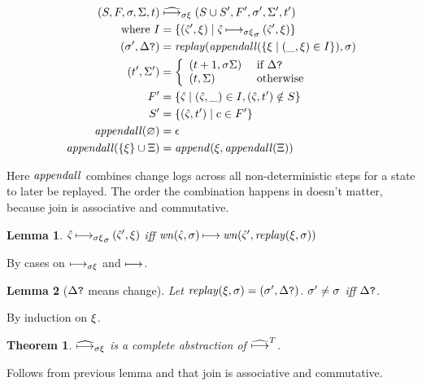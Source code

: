 \documentclass[preprint,onecolumn,9pt]{sigplanconf} %
\newtheorem{theorem}{Theorem}
\newtheorem{lemma}{Lemma}
\begin{document}
\begin{align*}
(S, F, \sigma,\Sigma,t) &\mathrel{\mathbin{\widehat{\longmapsto}_{\mathit{\sigma\xi}}}} (S \cup S', F', \sigma',\Sigma',t') \\
\mbox{ where }
 I &= \{(\hat{\varsigma}',\xi) \mid \hat{\varsigma} \mathbin{\longmapsto_{\mathit{\sigma\xi}}}_\sigma (\hat{\varsigma}', \xi) \} \\
 (\sigma', \Delta\mbox{{\tt ?}}) &= \mathit{replay}(\mathit{appendall}(\{\xi \mid (\_,\xi) \in I\}),\sigma) \\
 (t', \Sigma') &=
     \left\{
       \begin{array}{ll}
         (t+1, \sigma\Sigma) & \text{ if } \Delta\mbox{{\tt ?}} \\
         (t, \Sigma) & \text{ otherwise}
       \end{array}\right. \\
 F' &= \{\hat{\varsigma} \mid (\hat{\varsigma},\_) \in I, (\hat{\varsigma},t') \notin S\} \\
 S' &= \{(\hat{\varsigma},t') \mid c \in F'\} \\
\mathit{appendall}(\varnothing) &= \epsilon \\
\mathit{appendall}(\{\xi\}\cup\Xi) &= \mathit{append}(\xi,\mathit{appendall}(\Xi))
\end{align*}

Here $\mathit{appendall}$ combines change logs across all non-deterministic
steps for a state to later be replayed. The order the combination
happens in doesn't matter, because join is associative and
commutative.

\begin{lemma}
$\hat{\varsigma} \mathbin{\longmapsto_{\mathit{\sigma\xi}}}_\sigma (\hat{\varsigma}', \xi)$ iff
$\mathit{wn}(\hat{\varsigma},\sigma) \mathbin{\longmapsto} \mathit{wn}(\hat{\varsigma}',\mathit{replay}(\xi,\sigma))$
\end{lemma}
By cases on $\mathbin{\longmapsto_{\mathit{\sigma\xi}}}$ and $\mathbin{\longmapsto}$.

\begin{lemma}[$\Delta\mbox{{\tt ?}}$ means change]
Let $\mathit{replay}(\xi,\sigma) = (\sigma', \Delta\mbox{{\tt ?}})$. $\sigma' \neq \sigma$ iff $\Delta\mbox{{\tt ?}}$.
\end{lemma}
By induction on $\xi$.

\begin{theorem}
$\mathbin{\widehat{\longmapsto}_{\mathit{\sigma\xi}}}$ is a complete abstraction of $\widehat{\mathbin{\longmapsto}}^T$.
\end{theorem}
Follows from previous lemma and that join is associative and commutative.


\end{document}
